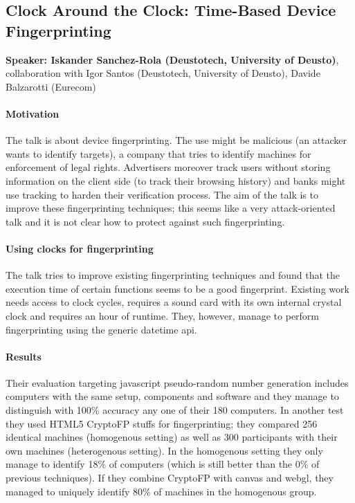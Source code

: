 \documentclass{article}
\begin{document}
\subsection{Clock Around the Clock: Time-Based Device Fingerprinting}
\noindent\textbf{Speaker: Iskander Sanchez-Rola (Deustotech, University of Deusto)}, collaboration with Igor Santos (Deustotech, University of Deusto), Davide Balzarotti (Eurecom)

\paragraph{Motivation} The talk is about device fingerprinting. The use might be malicious (an attacker wants to identify targets), a company that tries to identify machines for enforcement of legal rights. Advertisers moreover track users without storing information on the client side (to track their browsing history) and banks might use tracking to harden their verification process. The aim of the talk is to improve these fingerprinting techniques; this seems like a very attack-oriented talk and it is not clear how to protect against such fingerprinting. 

\paragraph{Using clocks for fingerprinting} The talk tries to improve existing fingerprinting techniques and found that the execution time of certain functions seems to be a good fingerprint. Existing work needs access to clock cycles, requires a sound card with its own internal crystal clock and requires an hour of runtime. They, however, manage to perform fingerprinting using the generic datetime api.

\paragraph{Results} Their evaluation targeting javascript pseudo-random number generation includes computers with the same setup, components and software and they manage to distinguish with 100\% accuracy any one of their 180 computers.
In another test they used HTML5 CryptoFP stuffs for fingerprinting; they compared 256 identical machines (homogenous setting) as well as 300 participants with their own machines (heterogenous setting). In the homogenous setting they only manage to identify 18\% of computers (which is still better than the 0\% of previous techniques). If they combine CryptoFP with canvas and webgl, they managed to uniquely identify 80\% of machines in the homogenous group.











\end{document}
